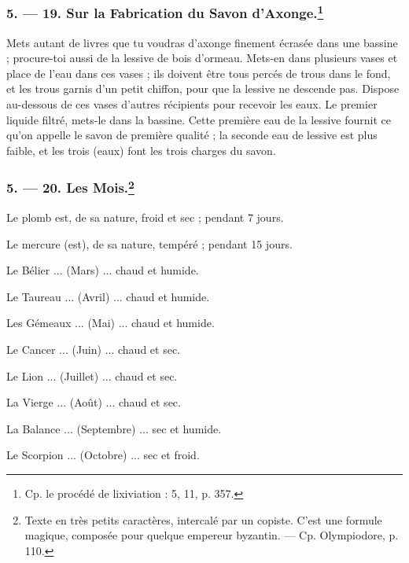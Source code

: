 \documentclass[a4paper, 11pt, oneside, polutonikogreek, french]{article}
\begin{document}
\bigskip
\centerline{\EightStarTaper}
\centerline{\EightStarTaper\EightStarTaper}
\bigskip

\subsubsection[5. --- 19. Sur la Fabrication du Savon d'Axonge.]{5. --- 19. Sur la Fabrication du Savon d'Axonge.\footnote{Cp. le procédé de lixiviation : 5, 11, p. 357.}}

Mets autant de livres que tu voudras d'axonge finement écrasée dans une bassine ; procure-toi aussi de la lessive de bois d'ormeau. Mets-en dans plusieurs vases et place de l'eau dans ces vases ; ils doivent être tous percés de trous dans le fond, et les trous garnis d'un petit chiffon, pour que la lessive ne descende pas. Dispose au-dessous de ces vases d'autres récipients pour recevoir les eaux. Le premier liquide filtré, mets-le dans la bassine. Cette première eau de la lessive fournit ce qu'on appelle le savon de première qualité ; la seconde eau de lessive est plus faible, et les trois (eaux) font les trois charges du savon.

\bigskip
\centerline{\EightStarTaper}
\centerline{\EightStarTaper\EightStarTaper}
\bigskip

\subsubsection[5. --- 20. Les Mois.]{5. --- 20. Les Mois.\footnote{Texte en très petits caractères, intercalé par un copiste. C'est une formule magique, composée pour quelque empereur byzantin. --- Cp. Olympiodore, p. 110.}}

Le plomb est, de sa nature, froid et sec ; pendant 7 jours.

Le mercure (est), de sa nature, tempéré ; pendant 15 jours.

Le Bélier ... (Mars) ... chaud et humide.

Le Taureau ... (Avril) ... chaud et humide.

Les Gémeaux ... (Mai) ... chaud et humide.

Le Cancer ... (Juin) ... chaud et sec.

Le Lion ... (Juillet) ... chaud et sec.

La Vierge ... (Août) ... chaud et sec.

La Balance ... (Septembre) ... sec et humide.

Le Scorpion ... (Octobre) ... sec et froid.
\end{document}
